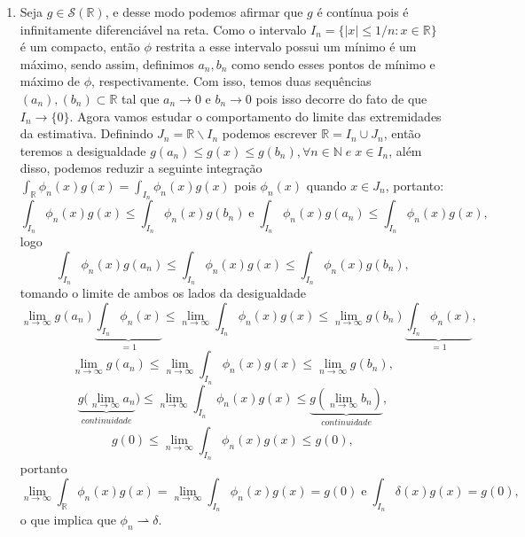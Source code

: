\documentclass{article}
\begin{document}
\begin{enumerate}
\begin{enumerate}
					
				\item Seja $g \in \mathcal{S}(\mathbb{R})$, e desse modo 
				podemos afirmar que $g$ é contínua pois é infinitamente diferenciável na reta. Como o intervalo $I_{n} = \{|x| \leq 1/n: x \in \mathbb{R} \}$ é um compacto, então $\phi$ restrita a esse intervalo possui um mínimo é um máximo, sendo assim, definimos $a_{n}, b_{n}$ como sendo esses pontos de mínimo e máximo de $\phi$, respectivamente. Com isso, temos duas sequências $(a_{n}), (b_{n}) \subset \mathbb{R}$ tal que $a_{n} \to 0$ e $b_{n} \to 0$ pois isso decorre do fato de que $I_{n} \to \{0\}$. Agora vamos estudar o comportamento do limite das extremidades da estimativa. Definindo $J_{n} = \mathbb{R}\backslash I_{n}$ podemos escrever $\mathbb{R} = I_{n} \cup J_{n}$, então teremos a desigualdade $g(a_{n}) \leq g(x) \leq g(b_{n}), \forall n \in \mathbb{N} \; e \; x \in I_{n}$, além disso, podemos reduzir a seguinte integração $\int_{\mathbb{R}} \phi_{n}(x)g(x) = \int_{I_{n}} \phi_{n}(x)g(x)$ pois $\phi_{n}(x)$ quando $x \in J_{n}$, portanto:
				$$
				\int_{I_{n}} \phi_{n}(x) g(x) \leq \int_{I_{n}} \phi_{n}(x) g(b_{n}) \; \text{e} \;
				\int_{I_{n}} \phi_{n}(x) g(a_{n}) \leq \int_{I_{n}} \phi_{n}(x)g(x),
				$$
				logo
				$$
				\int_{I_{n}} \phi_{n}(x) g(a_{n}) 
				\leq \int_{I_{n}} \phi_{n}(x)g(x) \leq \int_{I_{n}} \phi_{n}(x) g(b_{n}),
				$$
				tomando o limite de ambos os lados da desigualdade
				$$
				\lim_{n\to \infty} g(a_{n}) \underbrace{ \int_{I_{n}} \phi_{n}(x) }_{=1}\leq \lim_{n\to \infty} \int_{I_{n}}\phi_{n}(x)g(x) \leq  \lim_{n\to \infty}  g(b_{n}) \underbrace{ \int_{I_{n}} \phi_{n}(x) }_{=1},
				$$
				$$
				\lim_{n\to \infty} g(a_{n}) \leq \lim_{n\to \infty} \int_{I_{n}}\phi_{n}(x)g(x) \leq  \lim_{n\to \infty}  g(b_{n}) ,
				$$
				$$
				\underbrace{ g(\lim_{n\to \infty} a_{n}}_{continuidade}) \leq \lim_{n\to \infty} \int_{I_{n}}\phi_{n}(x)g(x) \leq \underbrace{ g(\lim_{n\to \infty} b_{n}) }_{continuidade} ,
				$$
				$$
				g(0) \leq \lim_{n\to \infty} \int_{I_{n}}\phi_{n}(x)g(x) \leq  g(0) ,
				$$
				portanto
				$$
				 \lim_{n\to \infty} \int_{\mathbb{R}} \phi_{n}(x)g(x) = \lim_{n\to \infty} \int_{I_{n}}\phi_{n}(x)g(x) = g(0) \; \text{e} \; \int_{I_{n}}\delta(x)g(x) = g(0),
				$$
				o que implica que $\phi_{n} \rightharpoonup \delta$.
				

\end{enumerate}
\end{enumerate}
\end{document}
